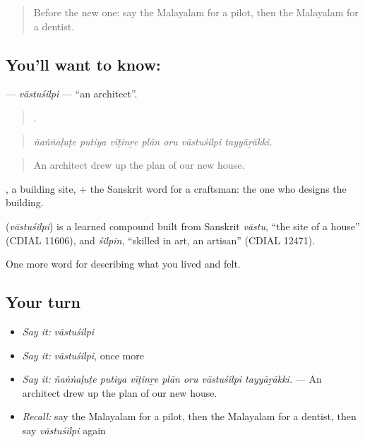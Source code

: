 \label{lesson:ML-C547-vastusilpi}



\begin{quote}
Before the new one: say the Malayalam for a pilot, then the Malayalam for a dentist.
\end{quote}

\subsection*{You'll want to know: }
\textbf{} — \emph{vāstuśilpi} — \textquotedblleft{}an architect\textquotedblright{}.

\begin{quote}
      .
\end{quote}

\begin{quote}
\emph{ñaṅṅaḷuṭe putiya vīṭinṟe plān oru vāstuśilpi tayyāṟākki.}
\end{quote}

\begin{quote}
An architect drew up the plan of our new house.
\end{quote}

, a building site, + the Sanskrit word for a craftsman: the one who designs the building.

\begin{cousinweb}
\textbf{} (\emph{vāstuśilpi}) is a learned compound built from Sanskrit \emph{vāstu}, \textquotedblleft{}the site of a house\textquotedblright{} (CDIAL 11606), and \emph{śilpin}, \textquotedblleft{}skilled in art, an artisan\textquotedblright{} (CDIAL 12471).
\end{cousinweb}

\begin{grammarlens}[title={What you've built}]
One more word for describing what you lived and felt.
\end{grammarlens}

\subsection*{Your turn}
\begin{itemize}
\raggedright
  \item \emph{Say it:} \emph{vāstuśilpi}
  \item \emph{Say it:} \emph{vāstuśilpi}, once more
  \item \emph{Say it:} \emph{ñaṅṅaḷuṭe putiya vīṭinṟe plān oru vāstuśilpi tayyāṟākki.} — An architect drew up the plan of our new house.
  \item \emph{Recall:} say the Malayalam for a pilot, then the Malayalam for a dentist, then say \emph{vāstuśilpi} again
\end{itemize}

